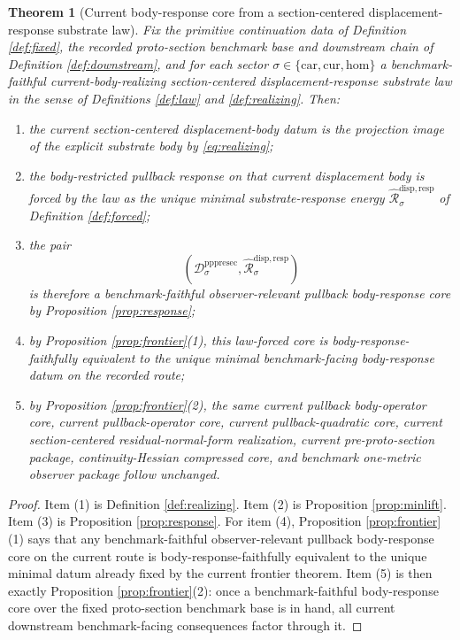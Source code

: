 \documentclass[11pt]{article}
\newcommand{\Car}{\mathrm{car}}
\newcommand{\Cur}{\mathrm{cur}}
\newcommand{\Hom}{\mathrm{hom}}
\newcommand{\PrePreProtoSectionResidualBody}[1]{\mathcal D_{#1}^{\mathrm{pppresec}}}
\newcommand{\ForcedBodyResponse}[1]{\widehat{\mathscr R}_{#1}^{\mathrm{disp,resp}}}
\newtheorem{theorem}{Theorem}
\begin{document}
\begin{theorem}[Current body-response core from a section-centered displacement-response substrate law]
\label{thm:main}
Fix the primitive continuation data of Definition \ref{def:fixed}, the recorded proto-section benchmark base and downstream chain of Definition \ref{def:downstream}, and for each sector \(\sigma\in\{\Car,\Cur,\Hom\}\) a benchmark-faithful current-body-realizing section-centered displacement-response substrate law in the sense of Definitions \ref{def:law} and \ref{def:realizing}. Then:
\begin{enumerate}
    \item the current section-centered displacement-body datum is the projection image of the explicit substrate body by \eqref{eq:realizing};
    \item the body-restricted pullback response on that current displacement body is forced by the law as the unique minimal substrate-response energy \(\ForcedBodyResponse{\sigma}\) of Definition \ref{def:forced};
    \item the pair
    \[
    \left(
    \PrePreProtoSectionResidualBody{\sigma},
    \ForcedBodyResponse{\sigma}
    \right)
    \]
    is therefore a benchmark-faithful observer-relevant pullback body-response core by Proposition \ref{prop:response};
    \item by Proposition \ref{prop:frontier}(1), this law-forced core is body-response-faithfully equivalent to the unique minimal benchmark-facing body-response datum on the recorded route;
    \item by Proposition \ref{prop:frontier}(2), the same current pullback body-operator core, current pullback-operator core, current pullback-quadratic core, current section-centered residual-normal-form realization, current pre-proto-section package, continuity-Hessian compressed core, and benchmark one-metric observer package follow unchanged.
\end{enumerate}
\end{theorem}

\begin{proof}
Item (1) is Definition \ref{def:realizing}. Item (2) is Proposition \ref{prop:minlift}. Item (3) is Proposition \ref{prop:response}. For item (4), Proposition \ref{prop:frontier}(1) says that any benchmark-faithful observer-relevant pullback body-response core on the current route is body-response-faithfully equivalent to the unique minimal datum already fixed by the current frontier theorem. Item (5) is then exactly Proposition \ref{prop:frontier}(2): once a benchmark-faithful body-response core over the fixed proto-section benchmark base is in hand, all current downstream benchmark-facing consequences factor through it.
\end{proof}
\end{document}
